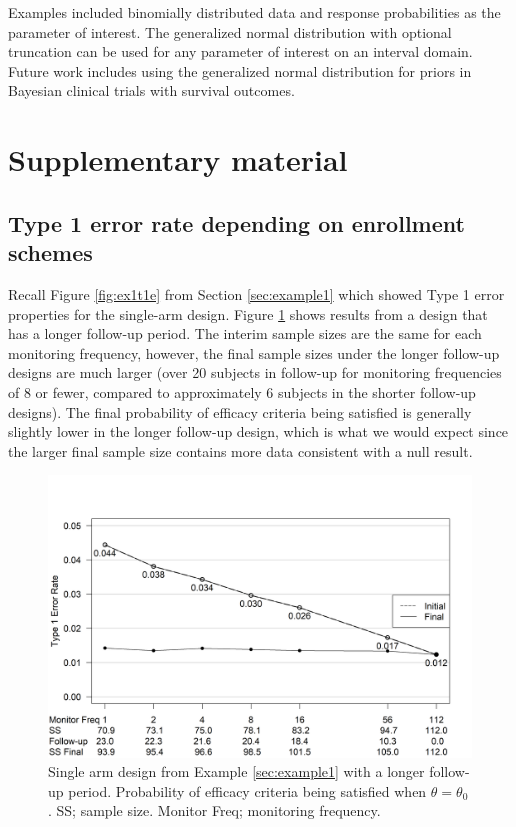 \documentclass[12pt]{article}
\begin{document}
Examples included binomially distributed data and response probabilities as the parameter of interest. The generalized normal distribution with optional truncation can be used for any parameter of interest on an interval domain. Future work includes using the generalized normal distribution for priors in Bayesian clinical trials with survival outcomes.


\section{Supplementary material}


\subsection{Type 1 error rate depending on enrollment schemes}
Recall Figure \ref{fig:ex1t1e} from Section \ref{sec:example1} which showed Type 1 error properties for the single-arm design. Figure \ref{fig:ex1t1e_longer} shows results from a design that has a longer follow-up period. The interim sample sizes are the same for each monitoring frequency, however, the final sample sizes under the longer follow-up designs are much larger (over 20 subjects in follow-up for monitoring frequencies of 8 or fewer, compared to approximately 6 subjects in the shorter follow-up designs). The final probability of efficacy criteria being satisfied is generally slightly lower in the longer follow-up design, which is what we would expect since the larger final sample size contains more data consistent with a null result.
\begin{figure}\begin{center}

   \includegraphics[width=6in]{./FIGURES/figureS1.png}
    \caption{Single arm design from Example \ref{sec:example1} with a longer follow-up period. Probability of efficacy criteria being satisfied when $\theta=\theta_0$. SS; sample size. Monitor Freq; monitoring frequency.}
	\label{fig:ex1t1e_longer}

\end{center}\end{figure}
\end{document}
